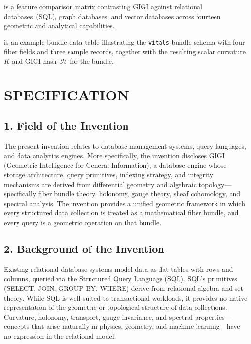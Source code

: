 \documentclass[11pt,letterpaper]{article}
\begin{document}
\begin{description}[leftmargin=2.2em, labelwidth=2em]
  \item[\textbf{TABLE~III}] is a feature comparison matrix contrasting GIGI
    against relational databases~(SQL), graph databases, and vector databases
    across fourteen geometric and analytical capabilities.

  \item[\textbf{TABLE~IV}] is an example bundle data table illustrating the
    \texttt{vitals} bundle schema with four fiber fields and three sample
    records, together with the resulting scalar curvature~$K$ and
    GIGI-hash~$\mathcal{H}$ for the bundle.
\end{description}


\newpage
\section*{SPECIFICATION}


\subsection*{1. Field of the Invention}

The present invention relates to database management systems, query languages, and data analytics engines. More specifically, the invention discloses GIGI (Geometric Intelligence for General Information), a database engine whose storage architecture, query primitives, indexing strategy, and integrity mechanisms are derived from differential geometry and algebraic topology---specifically fiber bundle theory, holonomy, gauge theory, sheaf cohomology, and spectral analysis. The invention provides a unified geometric framework in which every structured data collection is treated as a mathematical fiber bundle, and every query is a geometric operation on that bundle.


\subsection*{2. Background of the Invention}

Existing relational database systems model data as flat tables with rows and columns, queried via the Structured Query Language (SQL). SQL's primitives (SELECT, JOIN, GROUP BY, WHERE) derive from relational algebra and set theory. While SQL is well-suited to transactional workloads, it provides no native representation of the geometric or topological structure of data collections. Curvature, holonomy, transport, gauge invariance, and spectral properties---concepts that arise naturally in physics, geometry, and machine learning---have no expression in the relational model.
\end{document}
